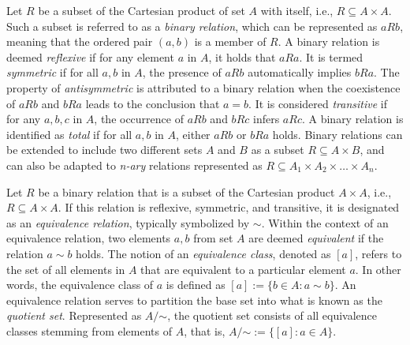 Let $R$ be a subset of the Cartesian product of set $A$ with itself, i.e., $R \subseteq A \times A$. Such a subset is referred to as a \emph{binary relation}, which can be represented as $aRb$, meaning that the ordered pair $(a, b)$ is a member of $R$. A binary relation is deemed \emph{reflexive} if for any element $a$ in $A$, it holds that $aRa$. It is termed \emph{symmetric} if for all $a, b$ in $A$, the presence of $aRb$ automatically implies $bRa$. The property of \emph{antisymmetric} is attributed to a binary relation when the coexistence of $aRb$ and $bRa$ leads to the conclusion that $a = b$. It is considered \emph{transitive} if for any $a, b, c$ in $A$, the occurrence of $aRb$ and $bRc$ infers $aRc$. A binary relation is identified as \emph{total} if for all $a, b$ in $A$, either $aRb$ or $bRa$ holds. Binary relations can be extended to include two different sets $A$ and $B$ as a subset $R \subseteq A \times B$, and can also be adapted to \emph{n-ary} relations represented as $R \subseteq A_1 \times A_2 \times \dots \times A_n$.

Let $R$ be a binary relation that is a subset of the Cartesian product $A \times A$, i.e., $R \subseteq A \times A$. If this relation is reflexive, symmetric, and transitive, it is designated as an \emph{equivalence relation}, typically symbolized by $\sim$. Within the context of an equivalence relation, two elements $a, b$ from set $A$ are deemed \emph{equivalent} if the relation $a \sim b$ holds. The notion of an \emph{equivalence class}, denoted as $[a]$, refers to the set of all elements in $A$ that are equivalent to a particular element $a$. In other words, the equivalence class of $a$ is defined as $[a] := \{ b \in A : a \sim b\}$. An equivalence relation serves to partition the base set into what is known as the \emph{quotient set}. Represented as $A / {\mathord {\sim }}$, the quotient set consists of all equivalence classes stemming from elements of $A$, that is, $A / {\mathord {\sim }} := \{ [a] : a \in A \}$.

